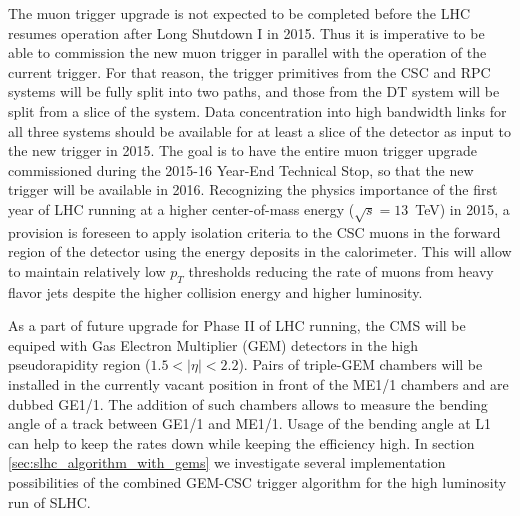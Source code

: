 The muon trigger upgrade is not expected to be completed before the LHC resumes operation after Long Shutdown I in 2015. Thus it is imperative to be able to commission the new muon trigger in parallel with the operation of the current trigger. For that reason, the trigger primitives from the CSC and RPC systems will be fully split into two paths, and those from the DT system will be split from a slice of the system. Data concentration into high bandwidth links for all three systems should be available for at least a slice of the detector as input to the new trigger in 2015. The goal is to have the entire muon trigger upgrade commissioned during the 2015-16 Year-End Technical Stop, so that the new trigger will be available in 2016. Recognizing the physics importance of the first year of LHC running at a higher center-of-mass energy ($\sqrt{s} = 13$~TeV) in 2015, a provision is foreseen to apply isolation criteria to the CSC muons in the forward region of the detector using the energy deposits in the calorimeter. This will allow to maintain relatively low $p_T$ thresholds reducing the rate of muons from heavy flavor jets despite the higher collision energy and higher luminosity.

As a part of future upgrade for Phase II of LHC running, the CMS will be equiped with Gas Electron Multiplier (GEM) detectors in the high pseudorapidity region ($1.5 < |\eta| < 2.2$). Pairs of triple-GEM chambers will be installed in the currently vacant position in front of the ME1/1 chambers and are dubbed GE1/1. The addition of such chambers allows to measure the bending angle of a track between GE1/1 and ME1/1. Usage of the bending angle at L1 can help to keep the rates down while keeping the efficiency high. In section \ref{sec:slhc_algorithm_with_gems} we investigate several implementation possibilities of the combined GEM-CSC trigger algorithm for the high luminosity run of SLHC.